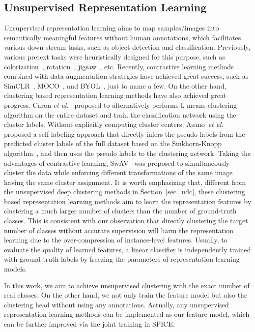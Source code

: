 \documentclass[journal]{IEEEtran}
\newcommand{\etal}{\emph{et al.}\xspace}
\begin{document}
\subsection{Unsupervised Representation Learning}
Unsupervised representation learning aims to map samples/images into semantically meaningful features without human annotations, which facilitates various down-stream tasks, such as object detection and classification. Previously, various pretext tasks were heuristically designed for this purpose, such as colorization~\cite{colorization2016}, rotation~\cite{rotation2018}, jigsaw~\cite{jigsaw2016}, etc.
Recently, contrastive learning methods combined with data augmentation strategies have achieved great success, such as SimCLR~\cite{simclr}, MOCO~\cite{He_2020_CVPR}, and BYOL~\cite{byol}, just to name a few.
On the other hand, clustering based representation learning methods have also achieved great progress.
Caron \etal~\cite{vf2018} proposed to alternatively performs k-means clustering algorithm on the entire dataset and train the classification network using the cluster labels.
Without explicitly computing cluster centers, Asano~\etal~\cite{Self-labelling} proposed a self-labeling approach that directly infers the pseudo-labels from the predicted cluster labels of the full dataset based on the Sinkhorn-Knopp algorithm~\cite{Sinkhorn}, and then uses the pseudo labels to the clustering network. 
Taking the advantages of contrastive learning, SwAV~\cite{caron2020swav} was proposed to simultaneously cluster the data while enforcing different transformations of the same image having the same cluster assignment.
It is worth emphasizing that, different from the unsupervised deep clustering methods in Section~\ref{sec_udc},  these clustering based representation learning methods aim to learn the representation features by clustering a much larger number of clusters than the number of ground-truth classes. This is consistent with our observation that directly clustering the target number of classes without accurate supervision will harm the representation learning due to the over-compression of instance-level features. Usually, to evaluate the quality of learned features, a linear classifier is independently trained with ground truth labels by freezing the parameters of representation learning models.

In this work, we aim to achieve unsupervised clustering with the exact number of real classes. On the other hand, we not only train the feature model but also the clustering head without using any annotations.
Actually, any unsupervised representation learning methods can be implemented as our feature model, which can be further improved via the joint training in SPICE.
\end{document}
